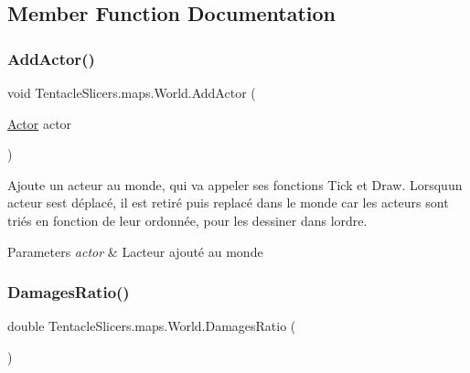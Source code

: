 \subsection{Member Function Documentation}
\mbox{\label{class_tentacle_slicers_1_1maps_1_1_world_a50ddf5fe23bb64a24f987dd6019b4105}} 
\subsubsection{\texorpdfstring{Add\+Actor()}{AddActor()}}
{\footnotesize\ttfamily void Tentacle\+Slicers.\+maps.\+World.\+Add\+Actor (\begin{DoxyParamCaption}\item[{\hyperlink{class_tentacle_slicers_1_1actors_1_1_actor}{Actor}}]{actor }\end{DoxyParamCaption})}



Ajoute un acteur au monde, qui va appeler ses fonctions Tick et Draw. Lorsqu\textquotesingle{}un acteur s\textquotesingle{}est déplacé, il est retiré puis replacé dans le monde car les acteurs sont triés en fonction de leur ordonnée, pour les dessiner dans l\textquotesingle{}ordre. 


\begin{DoxyParams}{Parameters}
{\em actor} & L\textquotesingle{}acteur ajouté au monde \\
\hline
\end{DoxyParams}
\mbox{\label{class_tentacle_slicers_1_1maps_1_1_world_a41d0d2bfd31016cd3ae740cc7caf1cfb}} 
\subsubsection{\texorpdfstring{Damages\+Ratio()}{DamagesRatio()}}
{\footnotesize\ttfamily double Tentacle\+Slicers.\+maps.\+World.\+Damages\+Ratio (\begin{DoxyParamCaption}{ }\end{DoxyParamCaption})}



